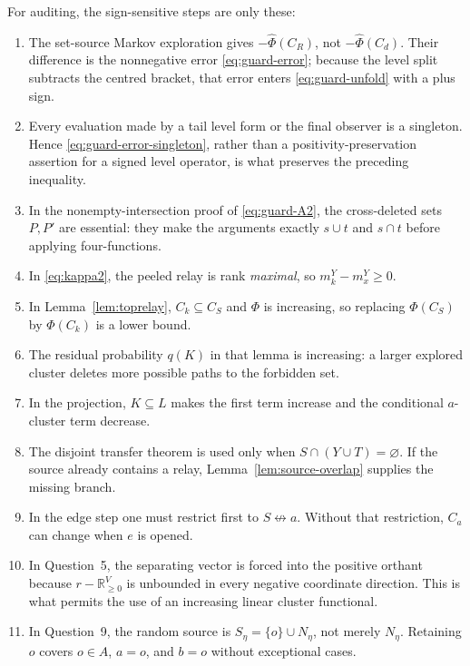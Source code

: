 \documentclass[11pt]{article}
\theoremstyle{definition}
\theoremstyle{remark}
\newcommand{\ncon}{\not\leftrightarrow}
\begin{document}
For auditing, the sign-sensitive steps are only these:
\begin{enumerate}[leftmargin=2.2em]
\item The set-source Markov exploration gives
  $-\widehat\Phi(C_R)$, not $-\widehat\Phi(C_d)$.  Their difference is
  the nonnegative error \eqref{eq:guard-error}; because the level split
  subtracts the centred bracket, that error enters
  \eqref{eq:guard-unfold} with a plus sign.
\item Every evaluation made by a tail level form or the final observer is
  a singleton.  Hence \eqref{eq:guard-error-singleton}, rather than a
  positivity-preservation assertion for a signed level operator, is what
  preserves the preceding inequality.
\item In the nonempty-intersection proof of \eqref{eq:guard-A2}, the
  cross-deleted sets $P,P'$ are essential: they make the arguments exactly
  $s\cup t$ and $s\cap t$ before applying four-functions.
\item In \eqref{eq:kappa2}, the peeled relay is rank \emph{maximal}, so
  $m_k^Y-m_x^Y\geq0$.
\item In Lemma~\ref{lem:toprelay}, $C_k\subseteq C_S$ and $\Phi$ is
  increasing, so replacing $\Phi(C_S)$ by $\Phi(C_k)$ is a lower bound.
\item The residual probability $q(K)$ in that lemma is increasing: a
  larger explored cluster deletes more possible paths to the forbidden
  set.
\item In the projection, $K\subseteq L$ makes the first term increase and
  the conditional $a$-cluster term decrease.
\item The disjoint transfer theorem is used only when
  $S\cap(Y\cup T)=\varnothing$.  If the source already contains a relay,
  Lemma~\ref{lem:source-overlap} supplies the missing branch.
\item In the edge step one must restrict first to $S\ncon a$.  Without
  that restriction, $C_a$ can change when $e$ is opened.
\item In Question~5, the separating vector is forced into the positive
  orthant because $r-\mathbb R_{\geq0}^{V}$ is unbounded in every
  negative coordinate direction.  This is what permits the use of an
  increasing linear cluster functional.
\item In Question~9, the random source is
  $S_\eta=\{o\}\cup N_\eta$, not merely $N_\eta$.  Retaining $o$ covers
  $o\in A$, $a=o$, and $b=o$ without exceptional cases.
\end{enumerate}
\end{document}
